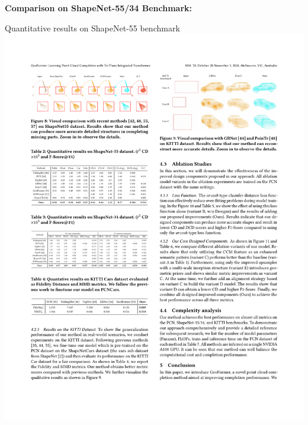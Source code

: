 \documentclass[landscape,a0paper,fontscale=0.292]{baposter}
\begin{document}
\begin{poster}
{\begin{minipage}[t]{0.49\textwidth}
    \end{minipage}\hfill
    \begin{minipage}[t]{0.49\textwidth}
        \vspace{-0.5em}
        \textbf{\color{ctitle}Comparison on ShapeNet-55/34 Benchmark:}
        \vspace{-0.6em}
        \begin{center}
            Quantitative results on ShapeNet-55 benchmark \\
            \includegraphics[width=\textwidth]{images/table-SP55.pdf}
        \end{center}
        \vspace{-1.8em}

\end{minipage}}
\end{poster}
\end{document}
